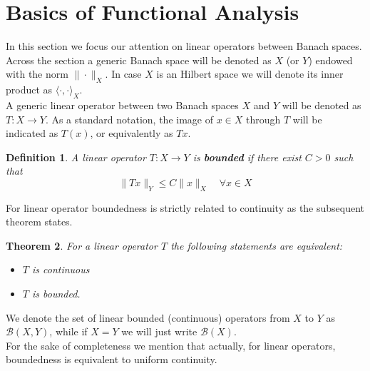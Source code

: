 \documentclass[corpo=11pt, stile=classica, tipotesi=custom,
greek, evenboxes, english]{toptesi}
\numberwithin{equation}{chapter}
\newtheorem{teo}{Theorem}[chapter] %
\newtheorem{defi}[teo]{Definition}
\newcommand{\B}{\mathscr{B}} %
\begin{document}
\section{Basics of Functional Analysis}\label{section basics of functional analysis}
In this section we focus our attention on linear operators between Banach spaces. Across the section a generic Banach space will be denoted as $X$ (or $Y$) endowed with the norm $\| \cdot \|_X$. In case $X$ is an Hilbert space we will denote its inner product as $\langle \cdot, \cdot \rangle_X$.\\
A generic linear operator between two Banach spaces $X$ and $Y$ will be denoted as $T : X \rightarrow Y$. As a standard notation, the image of $x \in X$ through $T$ will be indicated as $T(x)$, or equivalently as $Tx$.
\begin{defi}\label{bounded operator}
	A linear operator $T : X \rightarrow Y$ is \textbf{bounded} if there exist $C>0$ such that
	\begin{equation}\label{boundedness property}
		\| Tx \|_Y \leq C \| x \|_X \quad \forall x \in X
	\end{equation}
\end{defi}
For linear operator boundedness is strictly related to continuity as the subsequent theorem states.
\begin{teo}\label{equivalente boundedness continuity}
	For a linear operator $T$ the following statements are equivalent:
	\begin{itemize}
		\item $T$ is continuous
		\item $T$ is bounded.
	\end{itemize}
\end{teo}
We denote the set of linear bounded (continuous) operators from $X$ to $Y$ as $\B(X,Y)$, while if $X=Y$ we will just write $\B(X)$.\\
For the sake of completeness we mention that actually, for linear operators, boundedness is equivalent to uniform continuity.
\end{document}
